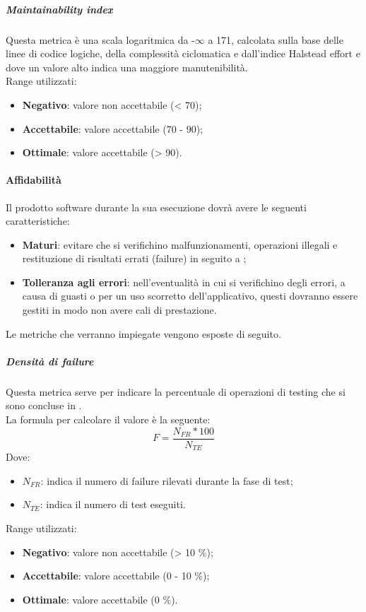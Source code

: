 \documentclass[../PianoDiQualifica.tex]{subfiles}
\begin{document}
			\subparagraph{Maintainability index}
			Questa metrica è una scala logaritmica da -$\infty$ a 171, calcolata sulla base delle linee di codice logiche, della complessità ciclomatica e dall'indice Halstead effort e dove un valore alto indica una maggiore manutenibilità.\\
				Range utilizzati:
				\begin{itemize}
					\item \textbf{Negativo}: valore non accettabile (< 70);
					\item \textbf{Accettabile}: valore accettabile (70 - 90);
					\item \textbf{Ottimale}: valore accettabile (> 90).
				\end{itemize}

			\paragraph{Affidabilità}
			Il prodotto software durante la sua esecuzione dovrà avere le seguenti caratteristiche:
			\begin{itemize}
				\item \textbf{Maturi}: evitare che si verifichino malfunzionamenti, operazioni illegali e restituzione di risultati errati (failure) in seguito a ;
				\item \textbf{Tolleranza agli errori}: nell'eventualità in cui si verifichino degli errori, a causa di guasti o per un uso scorretto dell'applicativo, questi dovranno essere gestiti in modo non avere cali di prestazione.
			\end{itemize}
			Le metriche che verranno impiegate vengono esposte di seguito.

			\subparagraph{Densità di failure}
			Questa metrica serve per indicare la percentuale di operazioni di testing che si sono concluse in  . \\La formula per calcolare il valore è la seguente:
			\begin{equation*}
				F = \frac{N_{FR}*100}{N_{TE}}
			\end{equation*}
			Dove:
			\begin{itemize}
				\item \textbf{$N_{FR}$}: indica il numero di failure rilevati durante la fase di test;
				\item \textbf{$N_{TE}$}: indica il numero di test eseguiti.
			\end{itemize}
			Range utilizzati:
			\begin{itemize}
					\item \textbf{Negativo}: valore non accettabile (> 10 \%);
					\item \textbf{Accettabile}: valore accettabile (0 - 10 \%);
					\item \textbf{Ottimale}: valore accettabile (0 \%).
			\end{itemize}
\end{document}
